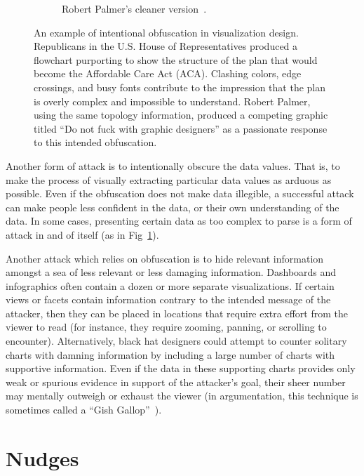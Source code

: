 \documentclass{vgtc}                          %
\begin{document}
\begin{figure}
\begin{subfigure}{0.9\columnwidth}
		\caption{Robert Palmer's cleaner version~\protect\cite{dontfuck}.}
	\end{subfigure}
	\caption{An example of intentional obfuscation in visualization design. Republicans in the U.S. House of Representatives produced a flowchart purporting to show the structure of the plan that would become the Affordable Care Act (ACA). Clashing colors, edge crossings, and busy fonts contribute to the impression that the plan is overly complex and impossible to understand. Robert Palmer, using the same topology information, produced a competing graphic titled ``Do not fuck with graphic designers'' as a passionate response to this intended obfuscation.}
	\label{fig:obfuscation}
\end{figure}

Another form of attack is to intentionally obscure the data values. That is, to make the process of visually extracting particular data values as arduous as possible. Even if the obfuscation does not make data illegible, a successful attack can make people less confident in the data, or their own understanding of the data. In some cases, presenting certain data as too complex to parse is a form of attack in and of itself (as in Fig~\ref{fig:obfuscation}).

Another attack which relies on obfuscation is to hide relevant information amongst a sea of less relevant or less damaging information. Dashboards and infographics often contain a dozen or more separate visualizations. If certain views or facets contain information contrary to the intended message of the attacker, then they can be placed in locations that require extra effort from the viewer to read (for instance, they require zooming, panning, or scrolling to encounter). Alternatively, black hat designers could attempt to counter solitary charts with damning information by including a large number of charts with supportive information. Even if the data in these supporting charts provides only weak or spurious evidence in support of the attacker's goal, their sheer number may mentally outweigh or exhaust the viewer (in argumentation, this technique is sometimes called a ``Gish Gallop''~\cite{gish}).

\section{Nudges}
\end{document}
